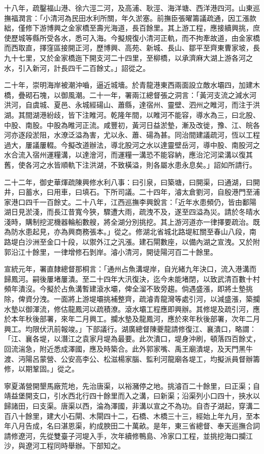\begin{pinyinscope}
十八年，疏鑿福山港、徐六涇二河，及高浦、耿涇、海洋塘、西洋港四河。山東巡撫福潤言：「小清河為民田水利所關，年久淤塞。前撫臣張曜籌議疏通，因工漲款絀，僅修下游博興之金家橋至壽光海道，長百餘里。其上游工程，應接續興挑，庶使歷城等縣所受各水，悉可入海。今擬規復小清河正軌，而不拘牽故道，由金家橋而西取直，擇窪區接開正河，歷博興、高苑、新城、長山、鄒平至齊東曹家坡，長九十七里，又於金家橋迤下開支河二十四里，至柳橋，以承濟麻大湖上游各河之水，引入新河，計長四千二百餘丈。」詔從之。

二十年，崇明海岸被潮沖嚙，逼近城墻。於青龍港東西兩面設立敵水壩四，加建木橋，疊砌石塊，以御風潮。二十一年，署兩江總督張之洞言：「黃河支流之減水河洪河，自虞城、夏邑、永城經碭山、蕭縣，達宿州、靈壁、泗州之睢河，而注于洪湖。其間湖港紛歧，皆下注睢河。乾隆年間，以睢河不能容，導水為三，曰北股、中股、南股。中股為睢河正流。咸豐初，黃河日益淤墊，漸及改徙，豫、江、皖各河亦逐段淤阻，水潦泛溢為害，尤以永、蕭、碭為甚。同治間建議疏河，恆以工程過大，屢議屢輟。今擬改道辦法，導北股河之水以達靈壁岳河，導中股、南股河之水合流入宿州運糧溝，以達澮河，而運糧一溝恐不能容納，應治沱河梁溝以復其舊，使各河之水皆順軌下注洪湖，不致橫溢，則各屬水患永息矣。」詔如所請行。

二十二年，御史華煇疏陳興修水利八事：曰引泉，曰築塘，曰開渠，曰通湖，曰開井，曰蓄水，曰用車，曰填石。下所司議。二十四年，濬太倉劉河，自殷港門至浦家港口四千一百餘丈。二十八年，江西巡撫李興銳言：「近年水患頻仍，皆由鄱陽湖日見淤淺，而長江昔寬今狹，驟遭大雨，疏洩不及，遂至四溢為災。請於冬晴水淺時，購制挖泥機器輪船數艘，將全湖分別挑挖。其上游河道亦一律擇要疏治。既為防水患起見，亦為興商務張本。」從之。修湖北省城北路堤紅關至春山八段，南路堤白沙洲至金口十段，以禦外江之汎漲。建石閘數座，以備內湖之宣洩。又於附郭沿江十餘里，一律增修石剝岸。濬小清河，開徒陽河百二十餘里。

宣統元年，署直隸總督那桐言：「通州占魚溝堤岸，自光緒九年決口，流入港溝而歸鳳河。嗣後屢堵屢潰。至二十四年大汛復決，迄今未能堵閉，以致武清百數十村頻年潰沒。今擬於占魚溝暫建滾水壩，俾全溜不致旁趨。倘遇盛漲，即將土墊挑除，俾資分洩。一面將上游堤壩挑補整齊，疏濬青龍灣等處引河，以減盛漲，築攔水墊以御渾流，修估龍鳳河以疏積潦。滾水壩工程應即興辦。其修堤及疏引河，應於本年秋後部署，來年二月興工。攔水墊及龍鳳河，應於來年秋後部署，次年二月興工。均限伏汛前報竣。」下部議行。湖廣總督陳夔龍請修復江、襄潰口，略謂：「江、襄各堤，以潛江之袁家月堤為最要。此次潰口，堤身沖刷，頓落四百餘丈，回流湍急，附近悉成澤國，應及時築合。此外郭家嘴、禹王廟潰堤，及天門黑牛渡、沔陽呂蒙營、公安高李公、松滋楊家腦、監利河龍廟各堤工，均擬派員督辦籌修，以期鞏固。」從之。

寧夏滿營開墾馬廠荒地，先治唐渠，以裕瀦停之地。挑濬百二十餘里，曰正渠；自靖益堡開支口，引水西北行四十餘里而入之溝，曰新渠；沿渠列小口四十，挾水以歸諸田，曰支渠。唐渠以西，淪為澤國，非溝以宣之不為功。自杏子湖起，穿溝二百八十餘里，建大小石閘、木閘四十二，石橋、木橋三十三，經始上年九月，至本年八月告成，名曰湛恩渠，約成腴田二十萬畝。是年，東三省總督、奉天巡撫合詞請修遼河，先從雙臺子河堤入手，次年續修鴨島、冷家口工程，並挑挖海口攔江沙，與遼河工程同時舉辦。下部知之。


\end{pinyinscope}